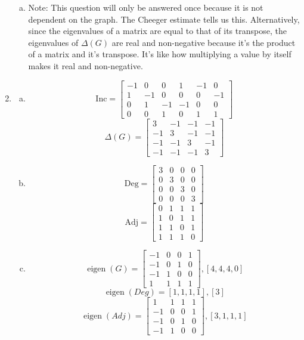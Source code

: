 \documentclass[12pt]{article}
\begin{document}
\begin{enumerate}[G1]
\begin{enumerate}[(a)]
			\item Note: This question will only be answered once because it is not dependent on the graph. The Cheeger estimate tells us this. Alternatively, since the eigenvalues of a matrix are equal to that of its transpose, the eigenvalues of $ \Delta(G) $ are real and non-negative because it's the product of a matrix and it's transpose. It's like how multiplying a value by itself makes it real and non-negative.
		\end{enumerate}
	
	\item 
		\begin{enumerate}[(a)]
			\item 
				\[\mathrm{Inc} = 
					\begin{bmatrix}
						-1 &  0 &  0 &  1 & -1 &  0\\
						1  & -1 &  0 &  0 &  0 & -1\\
						0  &  1 & -1 & -1 &  0 &  0\\
						0  &  0 &  1 &  0 &  1 &  1
					\end{bmatrix}
				\]
				\[
				\Delta(G) = 
					\begin{bmatrix}
						3 & -1 & -1 & -1\\
						-1 & 3 & -1 & -1\\
						-1 & -1 & 3 & -1\\
						-1 & -1 & -1 & 3
					\end{bmatrix}
				\]
			
			\item 
				\[\mathrm{Deg}=
					\begin{bmatrix}
						3 & 0 & 0 & 0\\
						0 & 3 & 0 & 0\\
						0 & 0 & 3 & 0\\
						0 & 0 & 0 & 3
					\end{bmatrix}
				\]
				\[\mathrm{Adj}=
					\begin{bmatrix}
						0 & 1 & 1 & 1\\
						1 & 0 & 1 & 1\\
						1 & 1 & 0 & 1\\
						1 & 1 & 1 & 0
					\end{bmatrix}
				\]
				
			\item 
				\[\operatorname{eigen}(G) = 
					\begin{bmatrix}
						-1 & 0 & 0 & 1\\
						-1 & 0 & 1 & 0\\
						-1 & 1 & 0 & 0\\
						1 & 1 & 1 & 1
					\end{bmatrix}, [4,4,4,0]
				\]
				\[\operatorname{eigen}(Deg) = [1,1,1,1], [3]\]
				\[\operatorname{eigen}(Adj) = 
					\begin{bmatrix}
						1 & 1 & 1 & 1\\
						-1 & 0 & 0 & 1\\
						-1 & 0 & 1 & 0\\
						-1 & 1 & 0 & 0
					\end{bmatrix}, [3,1,1,1]
				\]
		\end{enumerate}
	

\end{enumerate}
\end{document}
